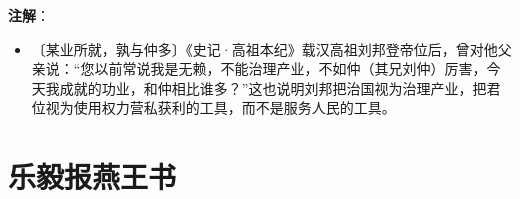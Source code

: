 \documentclass[12pt,UTF-8,openany]{ctexbook}
\begin{document}
\begin{normalsize}
\end{normalsize}


\newpage

\textbf{注解}：

\vspace{-1em}

\begin{itemize}
    \setlength\itemsep{-0.2em}
    \item〔某业所就，孰与仲多〕《史记·高祖本纪》载汉高祖刘邦登帝位后，曾对他父亲说：“您以前常说我是无赖，不能治理产业，不如仲（其兄刘仲）厉害，今天我成就的功业，和仲相比谁多？”这也说明刘邦把治国视为治理产业，把君位视为使用权力营私获利的工具，而不是服务人民的工具。
\end{itemize}

\chapter{乐毅报燕王书}
\end{document}
